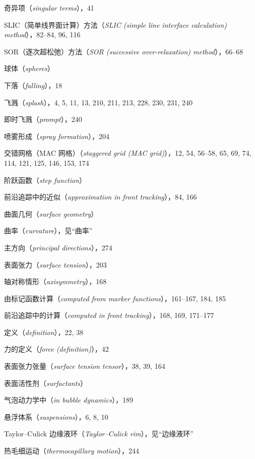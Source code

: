 \documentclass[11pt,a4paper,openany,fontset=none]{ctexbook}
\begin{document}
奇异项（\textit{singular terms}），41\par
SLIC（简单线界面计算）方法（\textit{SLIC (simple line interface calculation) method}），82--84, 96, 116\par
SOR（逐次超松弛）方法（\textit{SOR (successive over-relaxation) method}），66--68\par
球体（\textit{spheres}）\par
\quad 下落（\textit{falling}），18\par
飞溅（\textit{splash}），4, 5, 11, 13, 210, 211, 213, 228, 230, 231, 240\par
\quad 即时飞溅（\textit{prompt}），240\par
喷雾形成（\textit{spray formation}），204\par
交错网格（MAC 网格）（\textit{staggered grid (MAC grid)}），12, 54, 56--58, 65, 69, 74, 114, 121, 125, 146, 153, 174\par
阶跃函数（\textit{step function}）\par
\quad 前沿追踪中的近似（\textit{approximation in front tracking}），84, 166\par
曲面几何（\textit{surface geometry}）\par
\quad 曲率（\textit{curvature}），见“曲率”\par
\quad 主方向（\textit{principal directions}），274\par
表面张力（\textit{surface tension}），203\par
\quad 轴对称情形（\textit{axisymmetry}），168\par
\quad 由标记函数计算（\textit{computed from marker functions}），161--167, 184, 185\par
\quad 前沿追踪中的计算（\textit{computed in front tracking}），168, 169, 171--177\par
\quad 定义（\textit{definition}），22, 38\par
\quad 力的定义（\textit{force (definition)}），42\par
\quad 表面张力张量（\textit{surface tension tensor}），38, 39, 164\par
表面活性剂（\textit{surfactants}）\par
\quad 气泡动力学中（\textit{in bubble dynamics}），189\par
悬浮体系（\textit{suspensions}），6, 8, 10\par
Taylor--Culick 边缘液环（\textit{Taylor--Culick rim}），见“边缘液环”\par
热毛细运动（\textit{thermocapillary motion}），244\par
\end{document}
